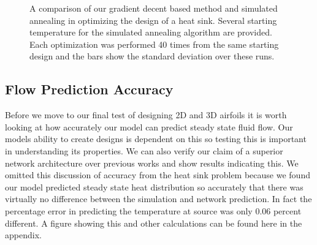 \documentclass{article} %
\begin{document}
\begin{figure}[h]
\begin{center}
\end{center}
\label{heat_sink_optimization}
\caption{A comparison of our gradient decent based method and simulated annealing in optimizing the design of a heat sink. Several starting temperature for the simulated annealing algorithm are provided. Each optimization was performed 40 times from the same starting design and the bars show the standard deviation over these runs.}
\end{figure}

\begin{figure}[h]
\begin{center}
\end{center}
\end{figure}


\subsection{Flow Prediction Accuracy}

Before we move to our final test of designing 2D and 3D airfoils it is worth looking at how accurately our model can predict steady state fluid flow. Our models ability to create designs is dependent on this so testing this is important in understanding its properties. We can also verify our claim of a superior network architecture over previous works and show results indicating this. We omitted this discussion of accuracy from the heat sink problem because we found our model predicted steady state heat distribution so accurately that there was virtually no difference between the simulation and network prediction. In fact the percentage error in predicting the temperature at source was only 0.06 percent different. A figure showing this and other calculations can be found here in the appendix.
\end{document}
